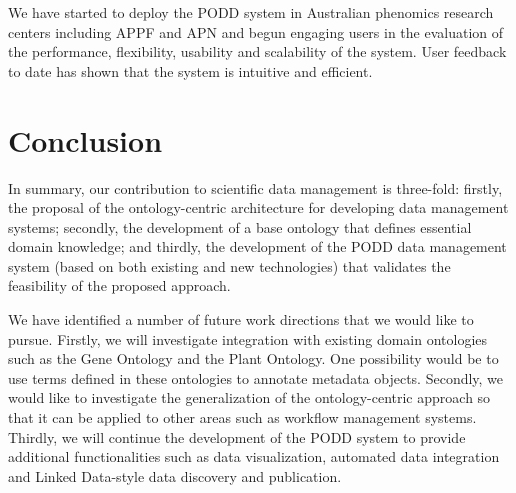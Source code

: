 \documentclass{llncs}
\begin{document}
We have started to deploy the PODD system in Australian phenomics
research centers including APPF and APN and begun engaging users in the
evaluation of the performance, flexibility, usability and scalability
of the system. User feedback to date has shown that the system is
intuitive and efficient.

\section{Conclusion}\label{sec:concl}
In summary, our contribution to scientific data management is
three-fold: firstly, the proposal of the ontology-centric architecture
for developing data management systems; secondly, the development of a
base ontology that defines essential domain knowledge; and thirdly, the
development of the PODD data management system (based on both existing
and new technologies) that validates the feasibility of the proposed
approach.

We have identified a number of future work directions that we would
like to pursue. Firstly, we will investigate integration with existing
domain ontologies such as the Gene Ontology and the Plant Ontology. One
possibility would be to use terms defined in these ontologies to
annotate metadata objects. Secondly, we would like to investigate the
generalization of the ontology-centric approach so that it can be
applied to other areas such as workflow management systems. Thirdly, we
will continue the development of the PODD system to provide additional
functionalities such as data visualization, automated data integration
and Linked Data-style data discovery and publication.




\end{document}

